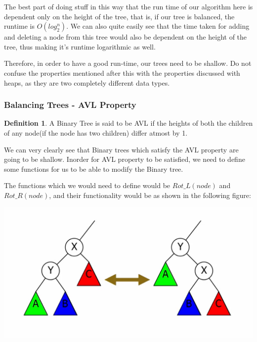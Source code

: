 \documentclass{article}
\theoremstyle{definition}
\newtheorem*{definition}{Definition}
\theoremstyle{example}
\begin{document}
\vspace{4mm}
\hspace{4mm} The best part of doing stuff in this way that the run time of our algorithm here is dependent only on the height of the tree, that is, if our tree is balanced, the runtime is $O(log_2^n)$. We can also quite easily see that the time taken for adding and deleting a node from this tree would also be dependent on the height of the tree, thus making it's runtime logarithmic as well.\par
\vspace{4mm}
Therefore, in order to have a good run-time, our trees need to be shallow. Do not confuse the properties mentioned after this with the properties discussed with heaps, as they are two completely different data types.

\subsubsection{\Large Balancing Trees - AVL Property}
\theoremstyle{definition}
\begin{definition}
    A Binary Tree is said to be AVL if the heights of both the children of any node(if the node has two children) differ atmost by 1.
\end{definition}
We can very clearly see that Binary trees which satisfy the AVL property are going to be shallow. Inorder for AVL property to be satisfied, we need to define some functions for us to be able to modify the Binary tree.\par
\vspace{4mm}
The functions which we would need to define would be $Rot\_L(node)$ and $Rot\_R(node)$, and their functionality would be as shown in the following figure:\par
\begin{center}
    \includegraphics[scale = 0.6]{rot.png}
\end{center}
\end{document}
